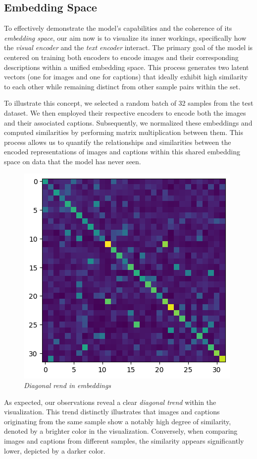 \documentclass[10pt,twocolumn,letterpaper]{article}
\begin{document}
\subsection{Embedding Space}

To effectively demonstrate the model's capabilities and the coherence of its \textit{embedding space}, our aim now is to visualize its inner workings, specifically how the \textit{visual encoder} and the \textit{text encoder} interact. The primary goal of the model is centered on training both encoders to encode images and their corresponding descriptions within a unified embedding space. This process generates two latent vectors (one for images and one for captions) that ideally exhibit high similarity to each other while remaining distinct from other sample pairs within the set.

To illustrate this concept, we selected a random batch of 32 samples from the test dataset.
We then employed their respective encoders to encode both the images and their associated captions.
Subsequently, we normalized these embeddings and computed similarities by performing matrix multiplication between them. This process allows us to quantify the relationships and similarities between the encoded representations of images and captions within this shared embedding space on data that the model has never seen.

\begin{figure}[H]
   \centering
   \includegraphics[width=0.6\linewidth]{img/Diagonal.png}
   \caption{\textit{Diagonal rend in embeddings}}
\end{figure}

As expected, our observations reveal a clear \textit{diagonal trend} within the visualization.
This trend distinctly illustrates that images and captions originating from the same sample show a notably high degree of similarity, denoted by a brighter color in the visualization.
Conversely, when comparing images and captions from different samples, the similarity appears significantly lower, depicted by a darker color.
\end{document}
